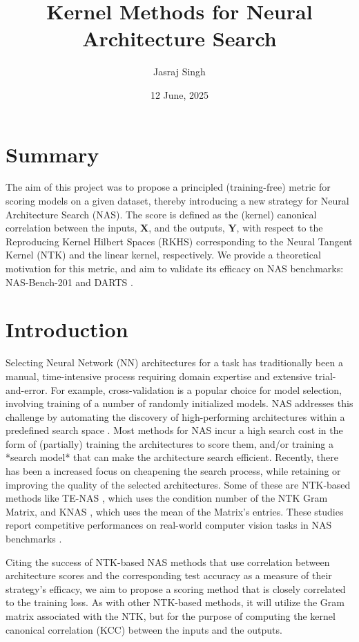 \documentclass[a4paper,12pt]{article}
\title{Kernel Methods for Neural Architecture Search}
\author{Jasraj Singh}
\date{12 June, 2025}
\begin{document}
\maketitle

\section{Summary}

The aim of this project was to propose a principled (training-free) metric for scoring models on a given dataset, thereby introducing a new strategy for Neural Architecture Search (NAS). The score is defined as the (kernel) canonical correlation \cite{akaho2007kcca,thomas2001kcca} between the inputs, $\mathbf{X}$, and the outputs, $\mathbf{Y}$, with respect to the Reproducing Kernel Hilbert Spaces (RKHS) corresponding to the Neural Tangent Kernel (NTK) and the linear kernel, respectively. We provide a theoretical motivation for this metric, and aim to validate its efficacy on NAS benchmarks: NAS-Bench-201 \cite{dong2020nasbench201} and DARTS \cite{liu2018darts}.

\section{Introduction}

Selecting Neural Network (NN) architectures for a task has traditionally been a manual, time-intensive process requiring domain expertise and extensive trial-and-error. For example, cross-validation is a popular choice for model selection, involving training of a number of randomly initialized models. NAS addresses this challenge by automating the discovery of high-performing architectures within a predefined search space \cite{poyser_2024_nas-review}. Most methods for NAS incur a high search cost in the form of (partially) training the architectures to score them, and/or training a *search model* that can make the architecture search efficient. Recently, there has been a increased focus on cheapening the search process, while retaining or improving the quality of the selected architectures. Some of these are NTK-based methods like TE-NAS \cite{chen2020tenas}, which uses the condition number of the NTK Gram Matrix, and KNAS \cite{pmlr-v139-xu21m}, which uses the mean of the Matrix's entries. These studies report competitive performances on real-world computer vision tasks in NAS benchmarks \cite{liu2018darts,ying19nasbench101,dong2020nasbench201}.

Citing the success of NTK-based NAS methods that use correlation between architecture scores and the corresponding test accuracy as a measure of their strategy's efficacy, we aim to propose a scoring method that is closely correlated to the training loss. As with other NTK-based methods, it will utilize the Gram matrix associated with the NTK, but for the purpose of computing the kernel canonical correlation (KCC) \cite{akaho2007kcca,thomas2001kcca} between the inputs and the outputs.
\end{document}

